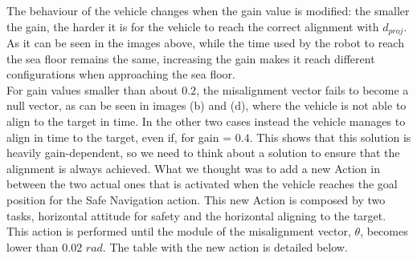 \documentclass{article}
\begin{document}
\begin{figure}[H]
	\centering
	\hspace{10mm}
	\label{im:v_land_gain0_4}
\end{figure} 

\begin{figure}[H]
	\centering
	\hspace{10mm}
	\label{im:v_land_gain0_7}
\end{figure} 

The behaviour of the vehicle changes when the gain value is modified: the smaller the gain, the harder it is for the vehicle to reach the correct alignment with \(d_{proj}\). As it can be seen in the images above, while the time used by the robot to reach the sea floor remains the same, increasing the gain makes it reach different configurations when approaching the sea floor.\\
For gain values smaller than about \(0.2\), the misalignment vector fails to become a null vector, as can be seen in images (b) and (d), where the vehicle is not able to align to the target in time. In the other two cases instead the vehicle manages to align in time to the target, even if, for gain = \(0.4\).
This shows that this solution is heavily gain-dependent, so we need to think about a solution to ensure that the alignment is always achieved.
What we thought was to add a new Action in between the two actual ones that is activated when the vehicle reaches the goal position for the Safe Navigation action. This new Action is composed by two tasks, horizontal attitude for safety and the horizontal aligning to the target. This action is performed until the module of the misalignment vector, $\theta$, becomes lower than \(0.02 \) \({rad}\). The table with the new action is detailed below. \\
\end{document}
